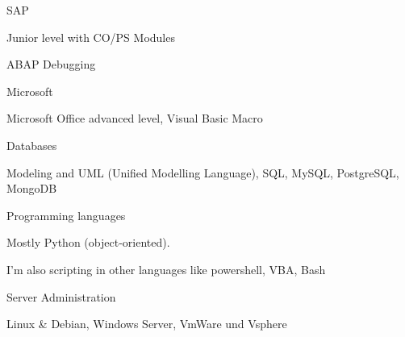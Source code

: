 

\begin{cventries}
	
	\zcventry
	{SAP} %
	{
		\begin{cvitems} %
			\item {Junior level with CO/PS Modules}
			\item {ABAP Debugging}
		\end{cvitems}
	}
	
	\zcventry
	{Microsoft} %
	{
		\begin{cvitems} %
			\item {Microsoft Office advanced level, Visual Basic Macro}
		\end{cvitems}
	}
	
	\zcventry
	{Databases} %
	{
		\begin{cvitems} %
			\item {Modeling and UML (Unified Modelling Language), SQL, MySQL, PostgreSQL, MongoDB}
		\end{cvitems}
	}
	
	\zcventry
	{Programming languages} %
	{
		\begin{cvitems} %
			\item {Mostly Python (object-oriented).}
			\item {I'm also scripting in other languages like powershell, VBA, Bash}
		\end{cvitems}
	}
	
	\zcventry
	{Server Administration} %
	{
		\begin{cvitems} %
			\item {Linux \& Debian, Windows Server, VmWare und Vsphere}
		\end{cvitems}
	}
	

\end{cventries}
